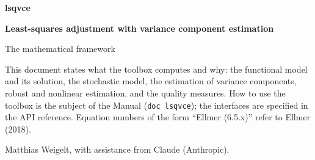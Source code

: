 \documentclass[11pt,a4paper,twoside,openany]{report}
\numberwithin{equation}{chapter}
\newcommand{\code}[1]{\texttt{#1}}
\begin{document}
\begin{titlepage}
\vspace*{35mm}
{\bfseries\Huge lsqvce\par}
\vspace{6mm}
{\bfseries\LARGE Least-squares adjustment with variance component estimation\par}
\vspace{4mm}
{\Large The mathematical framework\par}
\vspace{20mm}
\begin{remark}[Scope]
This document states what the toolbox computes and why: the functional model and its
solution, the stochastic model, the estimation of variance components, robust and
nonlinear estimation, and the quality measures. How to use the toolbox is the subject
of the Manual (\code{doc lsqvce}); the interfaces are specified in the API reference.
Equation numbers of the form ``Ellmer (6.5.x)'' refer to Ellmer (2018).
\end{remark}
\vfill
{\small Matthias Weigelt, with assistance from Claude (Anthropic).\par}
\end{titlepage}

\tableofcontents







\end{document}
